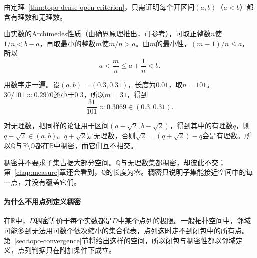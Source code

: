 \begin{example}[有理数与无理数都稠密]
\label{ex:topo-rationals-irrationals-dense}
由定理~\ref{thm:topo-dense-open-criterion}，只需证明每个开区间$(a,b)$（$a<b$）都含有理数和无理数。

由实数的Archimedes性质（由确界原理推出，可参考），可取正整数$n$使$1/n<b-a$，再取最小的整数$m$使$m/n>a$。由$m$的最小性，$(m-1)/n\leq a$，所以
\[
 a<\frac mn\leq a+\frac1n<b.
\]

用数字走一遍。设$(a,b)=(0.3,0.31)$，长度为$0.01$，取$n=101$。$30/101\approx0.2970$还小于$0.3$，所以$m=31$，得到
\[
 \frac{31}{101}\approx0.3069\in(0.3,0.31).
\]

对无理数，把同样的论证用于区间$(a-\sqrt2,b-\sqrt2)$，得到其中的有理数$q$，则$q+\sqrt2\in(a,b)$。$q+\sqrt2$是无理数，否则$\sqrt2=(q+\sqrt2)-q$会是有理数。所以$\mathbb Q$与$\mathbb R\setminus\mathbb Q$都在$\mathbb R$中稠密，而它们互不相交。
\end{example}

稠密并不要求子集占据大部分空间。$\mathbb Q$与无理数集都稠密，却彼此不交；第~\ref{chap:measure}章还会看到，$\mathbb Q$的长度为零。稠密只说明子集能接近空间中的每一点，并没有覆盖它们。

\paragraph{为什么不用点列定义稠密}
在$\mathbb R$中，$D$稠密等价于每个实数都是$D$中某个点列的极限。一般拓扑空间中，邻域可能多到无法用可数个依次缩小的集合代表，点列这时走不到闭包中的所有点。第~\ref{sec:topo-convergence}节将给出这样的空间，所以闭包与稠密性都以邻域定义，点列判据只在附加条件下成立。
